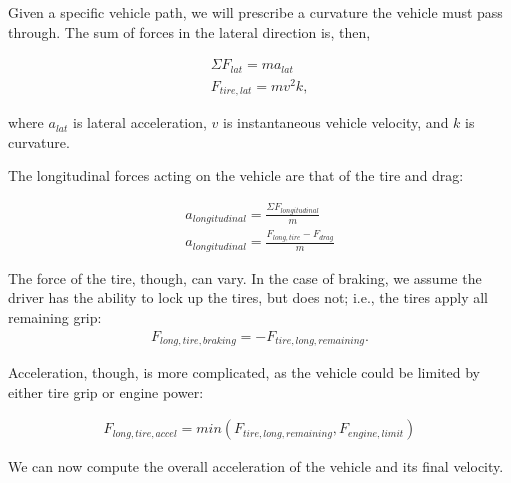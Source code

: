 \documentclass{article}
\begin{document}
Given a specific vehicle path, we will prescribe a curvature the vehicle must pass through. The sum of forces in the lateral direction is, then,

\begin{align}
    \Sigma F_{lat} = m a_{lat} \\
    F_{tire,lat} = m v^2 k, \label{eq_lateral}
\end{align}

where $a_{lat}$ is lateral acceleration, $v$ is instantaneous vehicle velocity, and $k$ is curvature.


%

The longitudinal forces acting on the vehicle are that of the tire and drag:

\begin{align}
    a_{longitudinal} = \frac{\Sigma F_{longitudinal}}{m}\\
    a_{longitudinal} = \frac{F_{long,tire} - F_{drag} }{m} \label{eq_accel}
\end{align}

The force of the tire, though, can vary. In the case of braking, we assume the driver has the ability to lock up the tires, but does not; i.e., the tires apply all remaining grip: 
\begin{align}
F_{long,tire,braking} = -F_{tire,long,remaining}. \label{eq_accel_brake}
\end{align}

Acceleration, though, is more complicated, as the vehicle could be limited by either tire grip or engine power:

\begin{align}
	F_{long,tire,accel} = min(F_{tire,long,remaining}, F_{engine,limit})
\end{align}

We can now compute the overall acceleration of the vehicle and its final velocity.
\end{document}
